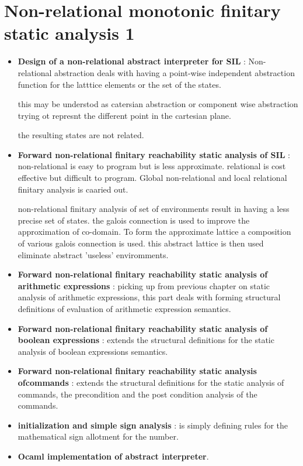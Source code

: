 \chapter{Non-relational monotonic finitary static analysis 1}

\begin{itemize}
	\item{\textbf{Design of a non-relational abstract interpreter for SIL} : Non-relational abstraction deals with having a point-wise independent abstraction function for the latttice elements or  the set of the states.

	this may be understod as catersian abstraction or component wise abstraction trying ot represnt the different point in the cartesian plane.

	the resulting states are not related.
	}

	\item{\textbf{Forward non-relational finitary reachability static analysis of SIL} :
	non-relational is easy to program but is less approximate.
	relational is cost effective but difficult to program. Global non-relational and local relational finitary analysis is caaried out.

	non-relational finitary analysis of set of environments result in having a less precise set of states. the galois connection is used to improve the approximation of co-domain. To form the approximate lattice a composition of various galois connection is used. this abstract lattice is then used eliminate abstract 'useless' enviromments. 

	}

	\item{\textbf{Forward non-relational finitary reachability static analysis of arithmetic expressions} : picking up from previous chapter on static analysis of arithmetic expressions, this part deals with forming structural definitions of evaluation of arithmetic expression semantics.
	}

	\item{\textbf{Forward non-relational finitary reachability static analysis of boolean expressions} : extends the structural definitions for the static analysis of boolean expressions semantics.
	}

	\item{\textbf{Forward non-relational finitary reachability static analysis ofcommands} : extends the structural definitions for the static analysis of commands, the precondition and the post condition analysis of the commands.
	}

	\item{\textbf{initialization and simple sign analysis} : is simply defining rules for the mathematical sign allotment for the number. 
	}

	\item{\textbf{Ocaml implementation of abstract interpreter}.  
	}

\end{itemize}